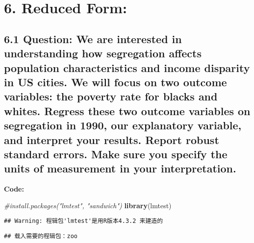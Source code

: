 \documentclass[
]{article}
\newenvironment{Shaded}{\begin{snugshade}}{\end{snugshade}}
\newcommand{\CommentTok}[1]{\textcolor[rgb]{0.56,0.35,0.01}{\textit{#1}}}
\newcommand{\FunctionTok}[1]{\textcolor[rgb]{0.13,0.29,0.53}{\textbf{#1}}}
\newcommand{\NormalTok}[1]{#1}
\begin{document}
\clearpage

\hypertarget{reduced-form}{%
\section{6. Reduced Form:}\label{reduced-form}}

\hypertarget{question-we-are-interested-in-understanding-how-segregation-affects-population-characteristics-and-income-disparity-in-us-cities.-we-will-focus-on-two-outcome-variables-the-poverty-rate-for-blacks-and-whites.-regress-these-two-outcome-variables-on-segregation-in-1990-our-explanatory-variable-and-interpret-your-results.-report-robust-standard-errors.-make-sure-you-specify-the-units-of-measurement-in-your-interpretation.}{%
\subsection{6.1 Question: We are interested in understanding how
segregation affects population characteristics and income disparity in
US cities. We will focus on two outcome variables: the poverty rate for
blacks and whites. Regress these two outcome variables on segregation in
1990, our explanatory variable, and interpret your results. Report
robust standard errors. Make sure you specify the units of measurement
in your
interpretation.}\label{question-we-are-interested-in-understanding-how-segregation-affects-population-characteristics-and-income-disparity-in-us-cities.-we-will-focus-on-two-outcome-variables-the-poverty-rate-for-blacks-and-whites.-regress-these-two-outcome-variables-on-segregation-in-1990-our-explanatory-variable-and-interpret-your-results.-report-robust-standard-errors.-make-sure-you-specify-the-units-of-measurement-in-your-interpretation.}}

\textbf{Code:}

\begin{Shaded}
\begin{Highlighting}[]
\CommentTok{\#install.packages("lmtest", "sandwich")}
\FunctionTok{library}\NormalTok{(lmtest)}
\end{Highlighting}
\end{Shaded}

\begin{verbatim}
## Warning: 程辑包'lmtest'是用R版本4.3.2 来建造的
\end{verbatim}

\begin{verbatim}
## 载入需要的程辑包：zoo
\end{verbatim}
\end{document}

